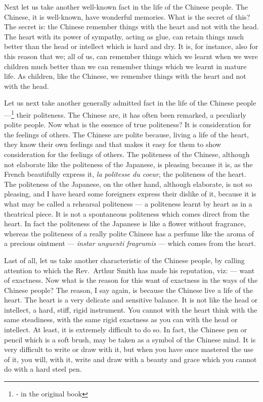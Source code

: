 Next let us take another well-known fact in the life of the Chinese people.
The Chinese, it is well-known, have wonderful memories.
What is the secret of this?
The secret is: the Chinese remember things with the heart and not with the head.
The heart with its power of sympathy, acting as glue, can retain things much better than the head or intellect which is hard and dry.
It is, for instance, also for this reason that we; all of us, can remember things which we learnt when we were children much better than we can remember things which we learnt in mature life.
As children, like the Chinese, we remember things with the heart and not with the head.

Let us next take another generally admitted fact in the life of the Chinese people ---\footnote{- in the original book} their politeness.
The Chinese are, it has often been remarked, a peculiarly polite people.
Now what is the essence of true politeness?
It is consideration for the feelings of others.
The Chinese are polite because, living a life of the heart, they know their own feelings and that makes it easy for them to show consideration for the feelings of others.
The politeness of the Chinese, although not elaborate like the politeness of the Japanese, is pleasing because it is, as the French beautifully express it, \emph{la politesse du coeur}, the politeness of the heart.
The politeness of the Japanese, on the other hand, although elaborate, is not so pleasing, and I have heard some foreigners express their dislike of it, because it is what may be called a rehearsal politeness --- a politeness learnt by heart as in a theatrical piece.
It is not a spontaneous politeness which comes direct from the heart.
In fact the politeness of the Japanese is like a flower without fragrance, whereas the politeness of a really polite Chinese has a perfume like the aroma of a precious ointment --- \emph{instar unguenti fragrumis} --- which comes from the heart.

Last of all, let us take another characteristic of the Chinese people, by calling attention to which the Rev.~Arthur Smith has made his reputation, viz: --- want of exactness.
Now what is the reason for this want of exactness in the ways of the Chinese people?
The reason, I say again, is because the Chinese live a life of the heart.
The heart is a very delicate and sensitive balance.
It is not like the head or intellect, a hard, stiff, rigid instrument.
You cannot with the heart think with the same steadiness, with the same rigid exactness as you can with the head or intellect.
At least, it is extremely difficult to do so.
In fact, the Chinese pen or pencil which is a soft brush, may be taken as a symbol of the Chinese mind.
It is very difficult to write or draw with it, but when you have once mastered the use of it, you will, with it, write and draw with a beauty and grace which you cannot do with a hard steel pen.

